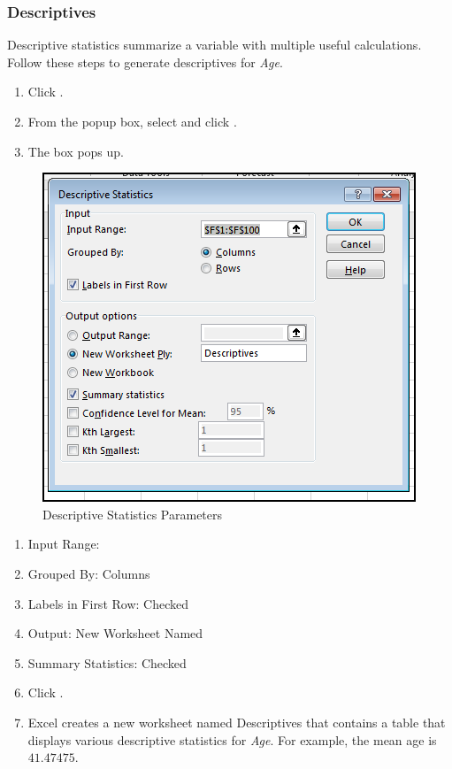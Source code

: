 \subsubsection{Descriptives}

Descriptive statistics summarize a variable with multiple useful calculations. Follow these steps to generate descriptives for \textit{Age}.

\begin{enumerate}[resume]
	\item Click .
	\item From the popup box, select  and click .
	\item The  box pops up.
\end{enumerate}

\begin{figure}[H]
	\centering
	\includegraphics[width=\maxwidth{.95\linewidth}]{gfx/ch09_fig60}
	\caption{Descriptive Statistics Parameters}
	\label{09:fig60}
\end{figure}

\begin{enumerate}[resume]
	\item Input Range: 
	\item Grouped By: Columns
	\item Labels in First Row: Checked
	\item Output: New Worksheet Named 
	\item Summary Statistics: Checked
	\item Click .
	\item Excel creates a new worksheet named Descriptives that contains a table that displays various descriptive statistics for \textit{Age}. For example, the mean age is $ 41.47475 $.
\end{enumerate}

